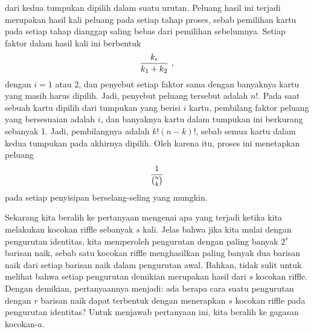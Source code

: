 dari kedua tumpukan dipilih dalam suatu urutan.  Peluang hasil ini terjadi merupakan hasil
kali peluang pada setiap tahap proses, sebab pemilihan kartu pada setiap tahap dianggap
saling bebas dari pemilihan sebelumnya.  Setiap faktor dalam hasil kali ini berbentuk
$${{k_i}\over{k_1 + k_2}}\ ,$$ dengan $i = 1$ atau $2$, dan penyebut setiap faktor sama
dengan banyaknya kartu yang masih harus dipilih.  Jadi, penyebut peluang tersebut adalah
$n!$.  Pada saat sebuah kartu dipilih dari tumpukan yang berisi $i$ kartu, pembilang
faktor peluang yang bersesuaian adalah $i$, dan banyaknya kartu dalam tumpukan ini
berkurang sebanyak 1.  Jadi, pembilangnya adalah $k!(n-k)!$, sebab semua kartu dalam
kedua tumpukan pada akhirnya dipilih.  Oleh karena itu, proses ini menetapkan peluang
$${1\over{{n}\choose{k}}}$$ pada setiap penyisipan berselang-seling yang mungkin.
\par 
Sekarang kita beralih ke pertanyaan mengenai apa yang terjadi ketika kita melakukan
kocokan riffle sebanyak $s$ kali.  Jelas bahwa jika kita mulai dengan pengurutan
identitas, kita memperoleh pengurutan dengan paling banyak $2^s$ barisan naik, sebab satu
kocokan riffle menghasilkan paling banyak dua barisan naik dari setiap barisan naik dalam
pengurutan awal.  Bahkan, tidak sulit untuk melihat bahwa setiap pengurutan demikian
merupakan hasil dari $s$ kocokan riffle.  Dengan demikian, pertanyaannya menjadi: ada
berapa cara suatu pengurutan dengan $r$ barisan naik dapat terbentuk dengan menerapkan
$s$ kocokan riffle pada pengurutan identitas?  Untuk menjawab pertanyaan ini, kita beralih
ke gagasan kocokan-$a$.
